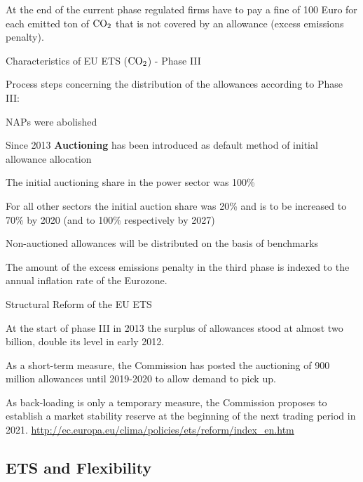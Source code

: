 	At the end of the current phase regulated firms have to pay a fine of 100 Euro for each emitted ton of $\textnormal{CO}_2$ that is not covered by an allowance (excess emissions penalty).

{Characteristics of EU ETS ($\textnormal{CO}_2$) - Phase III}

	Process steps concerning the distribution of the allowances according to Phase III:

	NAPs were  abolished

	Since 2013  \textbf{Auctioning} has been  introduced as default method of initial allowance allocation

	The initial auctioning share  in the power sector was 100\%

	For all other sectors the initial auction share was  20\% and is to be increased to 70\% by 2020 (and to 100\% respectively by 2027)

	Non-auctioned allowances will be distributed on the basis of benchmarks

	The amount of the excess emissions penalty in the third phase is indexed to the annual inflation rate of the Eurozone.  %

{Structural Reform of the EU ETS}

	At the start of phase III in 2013 the surplus of allowances stood at almost two billion, double its level in early 2012.

	As a short-term measure, the Commission has posted the auctioning of 900 million allowances until 2019-2020 to allow demand to pick up.

   As back-loading is only a temporary measure, the Commission proposes to establish a market stability reserve at the beginning of the next trading period in 2021.
 \url{http://ec.europa.eu/clima/policies/ets/reform/index_en.htm}

\subsection{ETS and Flexibility}

